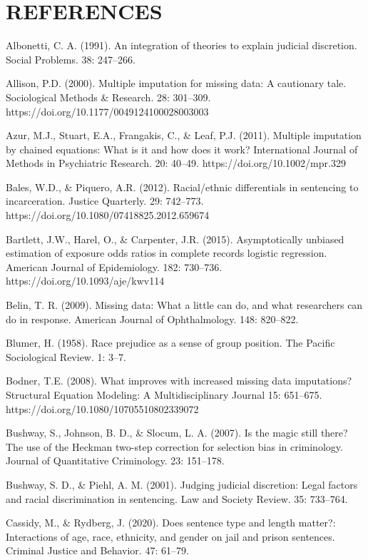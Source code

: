\documentclass[titlepage]{article}
\begin{document}
\section{REFERENCES}

Albonetti, C. A. (1991). An integration of theories to explain judicial discretion. Social Problems. 38: 247--266.

Allison, P.D. (2000). Multiple imputation for missing data: A cautionary tale. Sociological Methods \& Research. 28: 301--309. https://doi.org/10.1177/0049124100028003003

Azur, M.J., Stuart, E.A., Frangakis, C., \& Leaf, P.J. (2011). Multiple imputation by chained equations: What is it and how does it work? International Journal of Methods in Psychiatric Research. 20: 40--49. https://doi.org/10.1002/mpr.329

Bales, W.D., \& Piquero, A.R. (2012). Racial/ethnic differentials in sentencing to incarceration. Justice Quarterly. 29: 742--773. https://doi.org/10.1080/07418825.2012.659674

Bartlett, J.W., Harel, O., \& Carpenter, J.R. (2015). Asymptotically unbiased estimation of exposure odds ratios in complete records logistic regression. American Journal of Epidemiology. 182: 730--736. https://doi.org/10.1093/aje/kwv114

Belin, T. R. (2009). Missing data: What a little can do, and what researchers can do in response. American Journal of Ophthalmology. 148: 820--822.

Blumer, H. (1958). Race prejudice as a sense of group position. The Pacific Sociological Review. 1: 3--7.

Bodner, T.E. (2008). What improves with increased missing data imputations? Structural Equation Modeling: A Multidisciplinary Journal 15: 651–675. https://doi.org/10.1080/10705510802339072 

Bushway, S., Johnson, B. D., \& Slocum, L. A. (2007). Is the magic still there? The use of the Heckman two-step correction for selection bias in criminology. Journal of Quantitative Criminology. 23: 151--178.

Bushway, S. D., \& Piehl, A. M. (2001). Judging judicial discretion: Legal factors and racial discrimination in sentencing. Law and Society Review. 35: 733--764.

Cassidy, M., \& Rydberg, J. (2020). Does sentence type and length matter?: Interactions of age, race, ethnicity, and gender on jail and prison sentences. Criminal Justice and Behavior. 47: 61--79.
\end{document}
